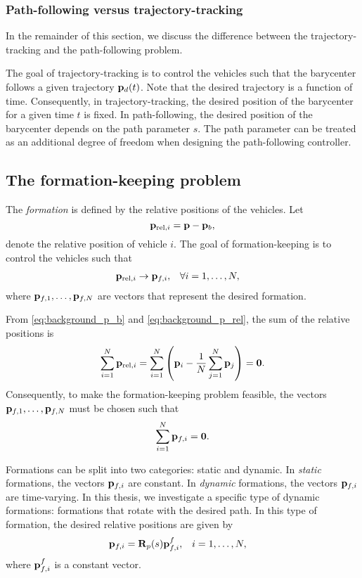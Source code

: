 \subsubsection{Path-following versus trajectory-tracking}
In the remainder of this section, we discuss the difference between the trajectory-tracking and the path-following problem.

The goal of trajectory-tracking is to control the vehicles such that the barycenter follows a given trajectory $\mathbf{p}_d(t)$.
Note that the desired trajectory is a function of time.
Consequently, in trajectory-tracking, the desired position of the barycenter for a given time $t$ is fixed.
In path-following, the desired position of the barycenter depends on the path parameter $s$.
The path parameter can be treated as an additional degree of freedom when designing the path-following controller.

\subsection{The formation-keeping problem}
\label{sec:background_formation_keeping}
The \emph{formation} is defined by the relative positions of the vehicles.
Let
\begin{equation}
    \mathbf{p}_{{\rm rel}, i} = \mathbf{p} - \mathbf{p}_b,
    \label{eq:background_p_rel}
\end{equation}
denote the relative position of vehicle $i$.
The goal of formation-keeping is to control the vehicles such that
\begin{align}
    &\mathbf{p}_{{\rm rel}, i} \rightarrow \mathbf{p}_{f, i}, &
    & \forall i = 1, \ldots, N,
\end{align}
where $\mathbf{p}_{f, 1}, \ldots, \mathbf{p}_{f, N}$ are vectors that represent the desired formation.

From \eqref{eq:background_p_b} and \eqref{eq:background_p_rel}, the sum of the relative positions is
\begin{equation}
    \sum_{i=1}^N \mathbf{p}_{{\rm rel}, i} = \sum_{i=1}^N \left(\mathbf{p}_i - \frac{1}{N}\sum_{j=1}^N \mathbf{p}_j \right) = \mathbf{0}.
\end{equation}
Consequently, to make the formation-keeping problem feasible, the vectors $\mathbf{p}_{f, 1}, \ldots, \mathbf{p}_{f, N}$ must be chosen such that
\begin{equation}
    \sum_{i=1}^N \mathbf{p}_{f, i} = \mathbf{0}.
\end{equation}

Formations can be split into two categories: static and dynamic.
In \emph{static} formations, the vectors $\mathbf{p}_{f, i}$ are constant.
In \emph{dynamic} formations, the vectors $\mathbf{p}_{f, i}$ are time-varying.
In this thesis, we investigate a specific type of dynamic formations: formations that rotate with the desired path.
In this type of formation, the desired relative positions are given by
\begin{align}
    \mathbf{p}_{f, i} &= \mathbf{R}_p(s) \mathbf{p}_{f, i}^f,&
    i &= 1, \ldots, N,
\end{align}
where $\mathbf{p}_{f, i}^f$ is a constant vector.

